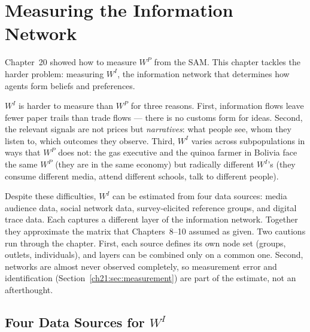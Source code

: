 \documentclass[../structural_economics_book.tex]{subfiles}
\begin{document}
\ifSubfilesClassLoaded{\setcounter{chapter}{20}}{}
\chapter{Measuring the Information Network}\label{ch:21}

\vspace{1em}

Chapter~20 showed how to measure $W^P$ from the SAM. This chapter tackles the harder problem: measuring $W^I$, the information network that determines how agents form beliefs and preferences.

$W^I$ is harder to measure than $W^P$ for three reasons. First, information flows leave fewer paper trails than trade flows --- there is no customs form for ideas. Second, the relevant signals are not prices but \textit{narratives}: what people see, whom they listen to, which outcomes they observe. Third, $W^I$ varies across subpopulations in ways that $W^P$ does not: the gas executive and the quinoa farmer in Bolivia face the same $W^P$ (they are in the same economy) but radically different $W^I$'s (they consume different media, attend different schools, talk to different people).

Despite these difficulties, $W^I$ can be estimated from four data sources: media audience data, social network data, survey-elicited reference groups, and digital trace data. Each captures a different layer of the information network. Together they approximate the matrix that Chapters~8--10 assumed as given. Two cautions run through the chapter. First, each source defines its own node set (groups, outlets, individuals), and layers can be combined only on a common one. Second, networks are almost never observed completely, so measurement error and identification (Section~\ref{ch21:sec:measurement}) are part of the estimate, not an afterthought.


\section{Four Data Sources for $W^I$}
\label{ch21:sec:sources}
\end{document}
